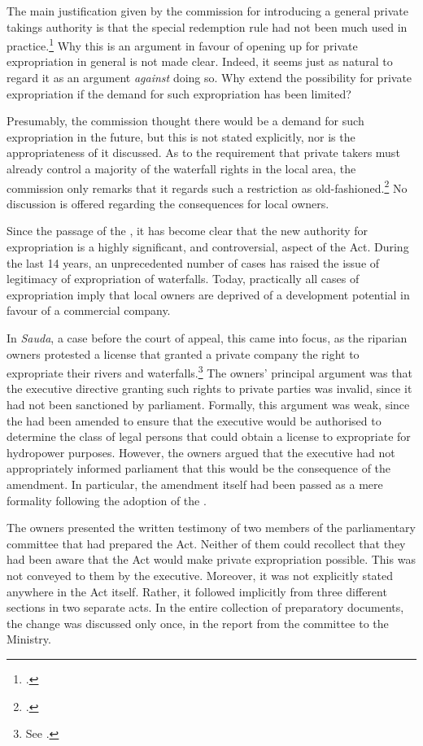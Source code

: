 The main justification given by the commission for introducing a general private takings authority is that the special redemption rule had not been much used in practice.\footcite[236]{nou94} Why this is an argument in favour of opening up for private expropriation in general is not made clear. Indeed, it seems just as natural to regard it as an argument {\it against} doing so. Why extend the possibility for private expropriation if the demand for such expropriation has been limited? 

Presumably, the commission thought there would be a demand for such expropriation in the future, but this is not stated explicitly, nor is the appropriateness of it discussed. As to the requirement that private takers must already control a majority of the waterfall rights in the local area, the commission only remarks that it regards such a restriction as old-fashioned.\footcite[236]{nou94} No discussion is offered regarding the consequences for local owners.

Since the passage of the \cite{wra00}, it has become clear that the new authority for expropriation is a highly significant, and controversial, aspect of the Act. During the last 14 years, an unprecedented number of cases has raised the issue of legitimacy of expropriation of waterfalls. Today, practically all cases of expropriation imply that local owners are deprived of a development potential in favour of a commercial company.

In {\it Sauda}, a case before the court of appeal, this came into focus, as the riparian owners protested a license that granted a private company the right to expropriate their rivers and waterfalls.\footnote{See \cite{sauda09}.} The owners' principal argument was that the executive directive granting such rights to private parties was invalid, since it had not been sanctioned by parliament. Formally, this argument was weak, since the \cite{ea59} had been amended to ensure that the executive would be authorised to determine the class of legal persons that could obtain a  license to expropriate for hydropower purposes. However, the owners argued that the executive had not appropriately informed parliament that this would be the consequence of the amendment. In particular, the amendment itself had been passed as a mere formality following the adoption of the \cite{wra00}. 

The owners presented the written testimony of two members of the parliamentary committee that had prepared the Act. Neither of them could recollect that they had been aware that the Act would make private expropriation possible. This was not conveyed to them by the executive. Moreover, it was not explicitly stated anywhere in the Act itself. Rather, it followed implicitly from three different sections in two separate acts. In the entire collection of preparatory documents, the change was discussed only once, in the report from the committee to the Ministry. 


